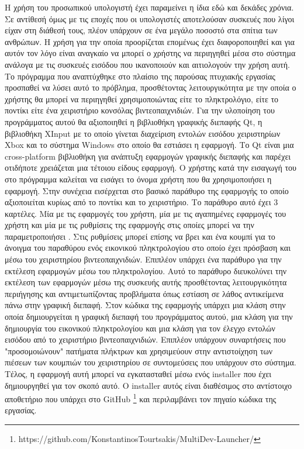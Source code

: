 






Η χρήση του προσωπικού υπολογιστή έχει παραμείνει η ίδια εδώ και δεκάδες χρόνια.
Σε αντίθεσή όμως με τις εποχές που οι υπολογιστές αποτελούσαν συσκευές που λίγοι
είχαν στη διάθεσή τους, πλέον υπάρχουν σε ένα μεγάλο ποσοστό στα σπίτια των
ανθρώπων. Η χρήση για την οποία προορίζεται επομένως έχει διαφοροποιηθεί και
για αυτόν τον λόγο είναι αναγκαίο να μπορεί ο χρήστης να περιηγηθεί μέσα στο σύστημα
ανάλογα με τις συσκευές εισόδου που ικανοποιούν και αιτιολογούν την χρήση αυτή.
Το πρόγραμμα που αναπτύχθηκε στο πλαίσιο της παρούσας πτυχιακής εργασίας 
προσπαθεί να λύσει αυτό το πρόβλημα, προσθέτοντας λειτουργικότητα
με την οποία ο χρήστης θα μπορεί να περιηγηθεί χρησιμοποιώντας είτε το πληκτρολόγιο,
είτε το ποντίκι είτε ένα χειριστήριο κονσόλας βιντεοπαιχνιδιών. Για την υλοποίηση του
προγράμματος αυτού θα αξιοποιηθεί η βιβλιοθήκη γραφικής διεπαφής Qt, η βιβλιοθήκη
XInput με το οποίο γίνεται διαχείριση εντολών εισόδου χειριστηρίων Xbox και το
σύστημα Windows στο οποίο θα εστιάσει η εφαρμογή. Το Qt είναι μια cross-platform βιβλιοθήκη
για ανάπτυξη εφαρμογών γραφικής διεπαφής και παρέχει οτιδήποτε χρειάζεται μια τέτοιου είδους εφαρμογή. Ο χρήστης κατά την εισαγωγή του
στο πρόγραμμα καλείται να εισάγει το όνομα χρήστη που θα χρησιμοποιήσει η εφαρμογή.
Στην συνέχεια εισέρχεται στο βασικό παράθυρο της εφαρμογής το οποίο αξιοποιείται κυρίως
από το ποντίκι και  το χειριστήριο. Το παράθυρο αυτό έχει 3 καρτέλες. Μία με τις εφαρμογές
του χρήστη, μία με τις αγαπημένες εφαρμογές του χρήστη και μία με τις ρυθμίσεις της εφαρμογής
στις οποίες μπορεί να την παραμετροποιήσει . Στις ρυθμίσεις μπορεί επίσης να βρει και ένα
κουμπί για το άνοιγμα του παραθύρου ενός εικονικού πληκτρολογίου στο οποίο έχει πρόσβαση και
μέσω του χειριστηρίου βιντεοπαιχνιδιών. Επιπλέον υπάρχει ένα παράθυρο για την εκτέλεση 
εφαρμογών μέσω του πληκτρολογίου. Αυτό το παράθυρο διευκολύνει την εκτέλεση των εφαρμογών μέσω της
συσκευής αυτής προσθέτοντας λειτουργικότητα περιήγησης και αντιμετωπίζοντας προβλήματα
όπως εστίαση σε λάθος αντικείμενα πάνω στην γραφική διεπαφή. Στον κώδικα της εφαρμογής υπάρχει
μια κλάση στην οποία δημιουργείται η γραφική διεπαφή του προγράμματος αυτού, μια κλάση για την
δημιουργία του εικονικού πληκτρολογίου και μια κλάση για τον έλεγχο εντολών εισόδου από το
χειριστήριο βιντεοπαιχνιδιών. Επιπλέον υπάρχουν συναρτήσεις που "προσομοιώνουν" πατήματα πλήκτρων
και χρησιμεύουν στην αντιστοίχηση των πιέσεων των κουμπιών του χειριστηρίου σε συντομεύσεις που
υπάρχουν στο σύστημα. Τέλος, η εφαρμογή αυτή μπορεί να εγκατασταθεί μέσω ενός installer που έχει
δημιουργηθεί για τον σκοπό αυτό. Ο installer αυτός είναι διαθέσιμος στο αντίστοιχο αποθετήριο που
υπάρχει στο GitHub \footnote{https://github.com/KonstantinosTourtsakis/MultiDev-Launcher/} και περιλαμβάνει τον πηγαίο κώδικα της εργασίας.


